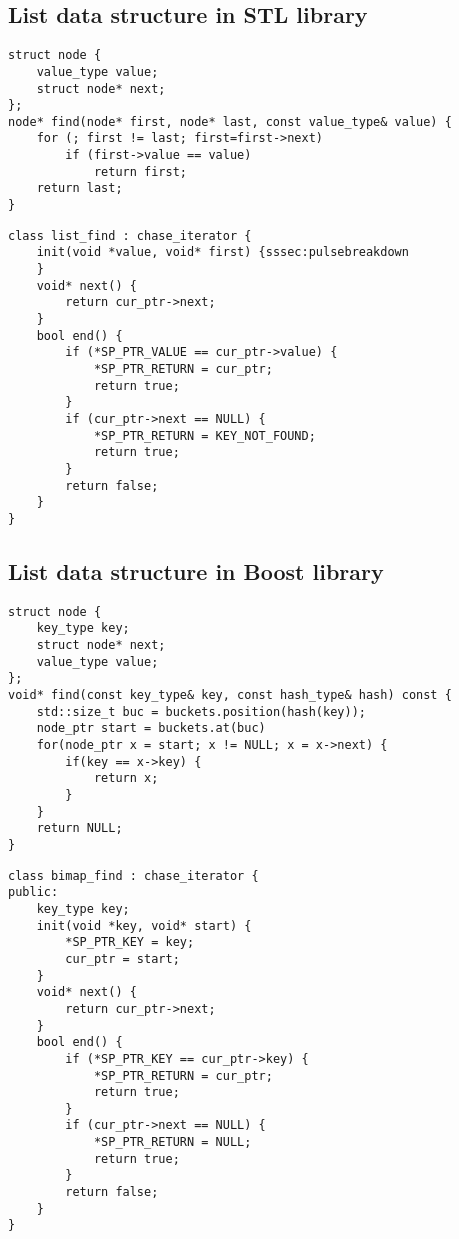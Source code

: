 \lstset{frame=tb,
  xleftmargin=0cm,
  linewidth=0.95\textwidth
}
\captionsetup[lstlisting]{style=centered_lstlisting}


\newpage
\subsection{List data structure in STL library}
\centering
\begin{lstlisting}[caption={C++ STL realization for \code{std::find()}},label={lst:list}]
struct node {
    value_type value;
    struct node* next;
};
node* find(node* first, node* last, const value_type& value) {
    for (; first != last; first=first->next)
        if (first->value == value)
            return first;
    return last;
}
\end{lstlisting}
\newpage

\begin{lstlisting}[caption={\pulse realization for \code{std::find()}},label={lst:list_mod}]
class list_find : chase_iterator {
    init(void *value, void* first) {sssec:pulsebreakdown
    }
    void* next() {
        return cur_ptr->next;
    }
    bool end() {
        if (*SP_PTR_VALUE == cur_ptr->value) {
            *SP_PTR_RETURN = cur_ptr;  
            return true;
        }
        if (cur_ptr->next == NULL) {
            *SP_PTR_RETURN = KEY_NOT_FOUND;  
            return true;
        }
        return false;
    }
}
\end{lstlisting}
\newpage


\subsection{List data structure in Boost library}
\centering
\begin{lstlisting}[caption={Boost realization for \code{bimap::find()}},label={lst:bimap}]
struct node {
    key_type key;
    struct node* next;
    value_type value;
};
void* find(const key_type& key, const hash_type& hash) const {
    std::size_t buc = buckets.position(hash(key));
    node_ptr start = buckets.at(buc)
    for(node_ptr x = start; x != NULL; x = x->next) {
        if(key == x->key) {
            return x;
        }
    }
    return NULL;
}
\end{lstlisting}

\newpage

\begin{lstlisting}[caption={\pulse realization for \code{bimap::find()}},label={lst:bimap_mod}]
class bimap_find : chase_iterator {
public:
    key_type key;
    init(void *key, void* start) {
        *SP_PTR_KEY = key;
        cur_ptr = start;
    }
    void* next() {
        return cur_ptr->next;
    }
    bool end() {
        if (*SP_PTR_KEY == cur_ptr->key) {
            *SP_PTR_RETURN = cur_ptr;
            return true;
        }
        if (cur_ptr->next == NULL) {
            *SP_PTR_RETURN = NULL;  
            return true;
        }
        return false;
    }
}
\end{lstlisting}
\newpage

